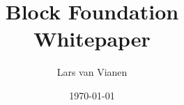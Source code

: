 \documentclass [10pt, fancyhdr, twoside] {article}
\title{%
Block Foundation \\
  \large Whitepaper}
\author{Lars van Vianen}
\date{\today}
\begin{document}



\maketitle

\begin{abstract}
\blindtext
\end{abstract}




\nocite{*}

% 

\end{document}
